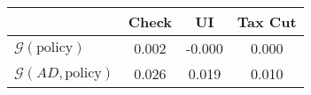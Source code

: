 \begin{tabular}{@{}lccc@{}} 
\toprule 
                          & Check      & UI    & Tax Cut    \\  \midrule 
$\mathcal{G}(\text{policy})$ & 0.002  & -0.000  & 0.000     \\ 
$\mathcal{G}(AD,\text{policy})$ & 0.026  & 0.019  & 0.010     \\ 
\end{tabular}  
